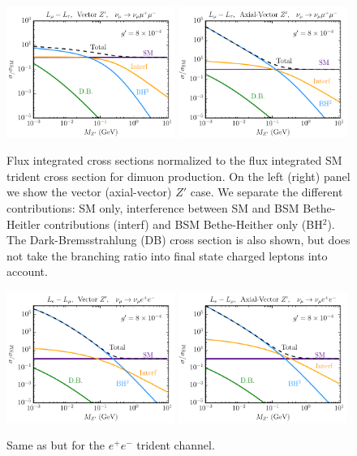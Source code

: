 %
\begin{figure}[t]
%
\includegraphics[width=0.49\textwidth]{SMvsBSMmass_xsec_mmmm_vec.pdf}
\includegraphics[width=0.49\textwidth]{SMvsBSMmass_xsec_mmmm_ax.pdf}
\caption[Total cross sections for dimuon tridents.]{\label{fig:xsecs_mmmm} Flux integrated cross sections normalized to the flux integrated SM trident cross section for dimuon production. On the left (right) panel we show the vector (axial-vector) $Z'$ 
case. We separate the different contributions:
 SM only, interference between SM and BSM Bethe-Heitler contributions (interf) and BSM Bethe-Heither only (BH$^2$). The Dark-Bremsstrahlung (DB) cross section is also shown, but does not take the branching ratio into final state charged leptons into account.}
%
\end{figure}
%
\begin{figure}[t]
%
\includegraphics[width=0.49\textwidth]{SMvsBSMmass_xsec_mmee_vec.pdf}
\includegraphics[width=0.49\textwidth]{SMvsBSMmass_xsec_mmee_ax.pdf}
%
\caption[Total cross sections for dielectron tridents.]{\label{fig:xsecs_mmee} Same as  but for the $e^+e^-$ trident channel.}
%
\end{figure}

